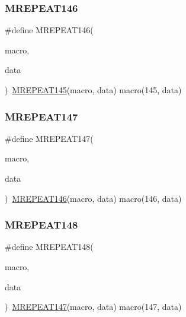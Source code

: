 \mbox{\label{group__group__sam0__utils__mrepeat_gab1dc20a39d993d2afbf5e0cb8ebe91a0}} 
\subsubsection{\texorpdfstring{MREPEAT146}{MREPEAT146}}
{\footnotesize\ttfamily \#define M\+R\+E\+P\+E\+A\+T146(\begin{DoxyParamCaption}\item[{}]{macro,  }\item[{}]{data }\end{DoxyParamCaption})~\mbox{\hyperlink{group__group__sam0__utils__mrepeat_gaf589b0dcb9d280437d5f44216096cb09}{M\+R\+E\+P\+E\+A\+T145}}(macro, data)   macro(145, data)}

\mbox{\label{group__group__sam0__utils__mrepeat_ga5fde582a7cf940039364190fade97523}} 
\subsubsection{\texorpdfstring{MREPEAT147}{MREPEAT147}}
{\footnotesize\ttfamily \#define M\+R\+E\+P\+E\+A\+T147(\begin{DoxyParamCaption}\item[{}]{macro,  }\item[{}]{data }\end{DoxyParamCaption})~\mbox{\hyperlink{group__group__sam0__utils__mrepeat_gab1dc20a39d993d2afbf5e0cb8ebe91a0}{M\+R\+E\+P\+E\+A\+T146}}(macro, data)   macro(146, data)}

\mbox{\label{group__group__sam0__utils__mrepeat_gae6c61eb095a85d084a71dee42aa35eac}} 
\subsubsection{\texorpdfstring{MREPEAT148}{MREPEAT148}}
{\footnotesize\ttfamily \#define M\+R\+E\+P\+E\+A\+T148(\begin{DoxyParamCaption}\item[{}]{macro,  }\item[{}]{data }\end{DoxyParamCaption})~\mbox{\hyperlink{group__group__sam0__utils__mrepeat_ga5fde582a7cf940039364190fade97523}{M\+R\+E\+P\+E\+A\+T147}}(macro, data)   macro(147, data)}

